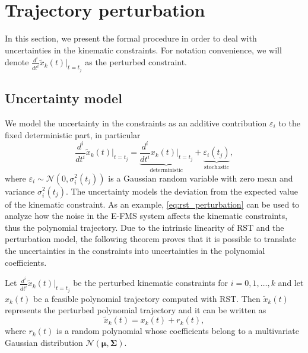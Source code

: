 \section{Trajectory perturbation}
\label{subsec:rst_perturbation}
In this section, we present the formal procedure in order to deal with uncertainties in the kinematic constraints. For notation convenience, we will denote $\frac{d^i}{dt^i}\tilde{x}_k(t)\bigr|_{t=t_j}$ as the perturbed constraint. 

\subsection{Uncertainty model}
We model the uncertainty in the constraints as an additive contribution $\varepsilon_i$ to the fixed deterministic part, in particular
\begin{equation}
\label{eq:rst_perturbation}
\frac{d^i}{dt^i}\tilde{x}_k(t)\bigr|_{t=t_j} = \underbrace{\frac{d^i}{dt^i}x_k(t)\bigr|_{t=t_j}}_{\text{deterministic}}+\underbrace{\varepsilon_i(t_j)}_{\text{stochastic}},
\end{equation}
where $\varepsilon_i\sim \mathcal{N}(0,\sigma^2_{i}(t_j))$ is a Gaussian random variable with zero mean and variance $\sigma^2_{i}(t_j)$. The uncertainty models the deviation from the expected value of the kinematic constraint.
As an example, \eqref{eq:rst_perturbation} can be used to analyze how the noise in the E-FMS system affects the kinematic constraints, thus the polynomial trajectory.
Due to the intrinsic linearity of RST and the perturbation model, the following theorem proves that it is possible to translate the uncertainties in the constraints into uncertainties in the polynomial coefficients. 


\begin{theorem}
\label{lemma:rst_Lemma6}
Let $\frac{d^i}{dt^i}\tilde{x}_k(t)\bigr|_{t=t_j}$ be the perturbed kinematic constraints for $i=0,1,\dots, k$ and let $x_k(t)$ be a feasible polynomial trajectory computed with RST. Then $\tilde{x}_k(t)$ represents the perturbed polynomial trajectory and it can be written as
\begin{equation}
\tilde{x}_k(t) = x_k(t)+r_k(t),
\end{equation} 
where $r_k(t)$ is a random polynomial whose coefficients belong to a multivariate Gaussian distribution $\mathcal{N(\mathbf{\mu,\Sigma})}$.
\end{theorem}

